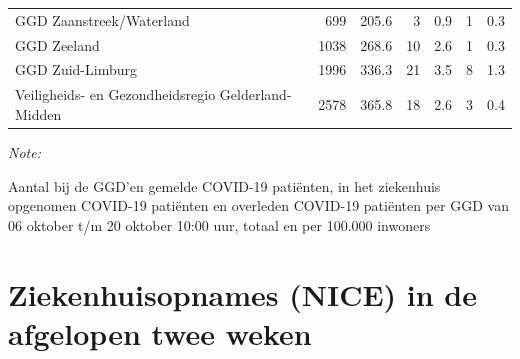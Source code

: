 \documentclass[
  english,
  man,floatsintext]{apa6}
\begin{document}
\begin{table}
\begin{threeparttable}
\begin{tabular}{lrrrrrr}
GGD Zaanstreek/Waterland & 699 & 205.6 & 3 & 0.9 & 1 & 0.3\\
GGD Zeeland & 1038 & 268.6 & 10 & 2.6 & 1 & 0.3\\
GGD Zuid-Limburg & 1996 & 336.3 & 21 & 3.5 & 8 & 1.3\\
Veiligheids- en Gezondheidsregio Gelderland-Midden & 2578 & 365.8 & 18 & 2.6 & 3 & 0.4\\
\bottomrule
\end{tabular}
\begin{tablenotes}
\item \textit{Note: } 
\item Aantal bij de GGD’en gemelde COVID-19 patiënten, in het ziekenhuis opgenomen COVID-19 patiënten en overleden COVID-19 patiënten per GGD van 06 oktober t/m 20 oktober 10:00 uur, totaal en per 100.000 inwoners
\end{tablenotes}
\end{threeparttable}
\endgroup{}
\end{table}

\newpage

\hypertarget{ziekenhuisopnames-nice-in-de-afgelopen-twee-weken}{%
\section{Ziekenhuisopnames (NICE) in de afgelopen twee weken}\label{ziekenhuisopnames-nice-in-de-afgelopen-twee-weken}}
\end{document}
